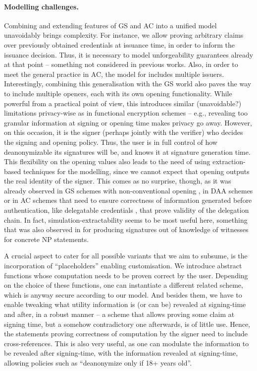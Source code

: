 \paragraph{Modelling challenges.} %
Combining and extending features of GS and AC into a unified model unavoidably
brings complexity. For instance, we allow proving arbitrary claims over
previously obtained credentials at issuance time, in order to inform the
issuance decision. Thus, it is necessary to model unforgeability guarantees
already at that point -- something not considered in previous works. Also, in
order to meet the general practice in AC, the model for \UAS includes multiple
issuers. Interestingly, combining this generalisation with the GS world also
paves the way to include multiple openers, each with its own opening
functionality. While powerful from a practical point of view, this introduces
similar (unavoidable?) limitations privacy-wise as in functional encryption
schemes \cite{bsw11} -- e.g., revealing too granular information at signing or
opening time makes privacy go away. However, on this occasion, it is the signer
(perhaps jointly with the verifier) who decides the signing and
opening policy. Thus, the user is in full control of how deanonymizable its
signatures will be, and knows it at signature generation time. This flexibility
on the opening values also leads to the
need of using extraction-based techniques for the modelling, since we cannot
expect that opening outputs the real identity of the signer. This comes as no
surprise, though, as it was already observed in GS schemes with non-conventional
opening \cite{dl21}, in DAA schemes \cite{cdl16,cdl16b} or in AC schemes that
need to ensure correctness of information generated before authentication, like
delegatable credentials \cite{bcc+09}, that prove validity of the delegation
chain. In fact, simulation-extractability seems to be most useful here,
something that was also observed in \cite{cl06} for producing signatures out of
knowledge of witnesses for concrete NP statements.

A crucial aspect to cater for all possible variants that we aim to subsume, is
the incorporation of ``placeholders'' enabling customisation. We introduce abstract
functions whose computation needs to be proven correct by the user. Depending on
the choice of these functions, one can instantiate a different related scheme,
which is anyway secure according to our \UAS model. And
besides them, we have to enable tweaking what utility information is (or can be)
revealed at signing-time and after, in a robust manner -- a scheme that allows
proving some claim at signing time, but a somehow contradictory one afterwards,
is of little use. Hence, the statements proving correctness of computation by
the signer need to include cross-references. This is also very useful, as one
can modulate the information to be revealed after signing-time, with the
information revealed at signing-time, allowing policies such as ``deanonymize
only if 18+ years old''.

